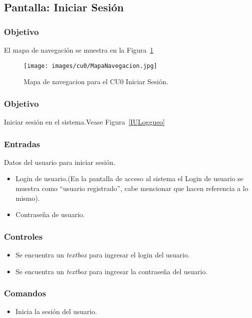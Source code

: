 \subsection{Pantalla: Iniciar Sesión}
\subsubsection{Objetivo}
	El mapa de navegación se muestra en la Figura~\ref{fig:mapaNavegacionCU0}

   \begin{figure}[hbpt!]
 		\centering
 			\texttt{[image: images/cu0/MapaNavegacion.jpg]}
 		\caption{Mapa de navegacion para el CU0 Iniciar Sesión.}
		\label{fig:mapaNavegacionCU0}
 	\end{figure}
\subsubsection{Objetivo}
Iniciar sesión en el sistema.Vease Figura~\ref{IULoggueo}


\subsubsection{Entradas}
Datos del usuario para iniciar sesión.
\begin{itemize}
\item Login de usuario.(En la pantalla de acceso al sistema el Login de usuario se muestra como ``usuario registrado'', cabe mencionar que hacen referencia a lo mismo).
\item Contraseña de usuario.
\end{itemize}

\subsubsection{Controles}
\begin{itemize}
 \item Se encuentra un \textit{textbox} para ingresar el login del usuario.
 \item Se encuentra un \textit{textbox} para ingresar la contraseña del usuario.
\end{itemize}

\subsubsection{Comandos}
\begin{itemize}
 \item {} Inicia la sesión del usuario.

\end{itemize}

